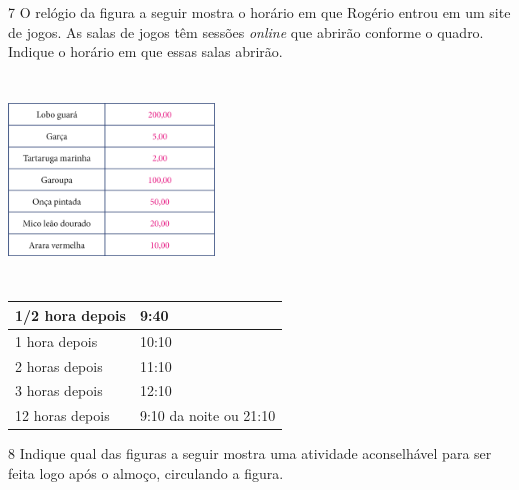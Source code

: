 \num{7} O relógio da figura a seguir mostra o horário em que Rogério entrou em um
site de jogos. As salas de jogos têm sessões \emph{online} que abrirão
conforme o quadro. Indique o horário em que essas salas abrirão.


\includegraphics[width=2.15625in,height=2.15625in]{media/image63.png}

\begin{longtable}[]{@{}ll@{}}
\toprule
1/2 hora depois & 9:40\tabularnewline
\midrule
\endhead
1 hora depois & 10:10\tabularnewline
2 horas depois & 11:10\tabularnewline
3 horas depois & 12:10\tabularnewline
12 horas depois & 9:10 da noite ou 21:10\tabularnewline
\bottomrule
\end{longtable}

\num{8} Indique qual das figuras a seguir mostra uma atividade aconselhável para
ser feita logo após o almoço, circulando a figura.


